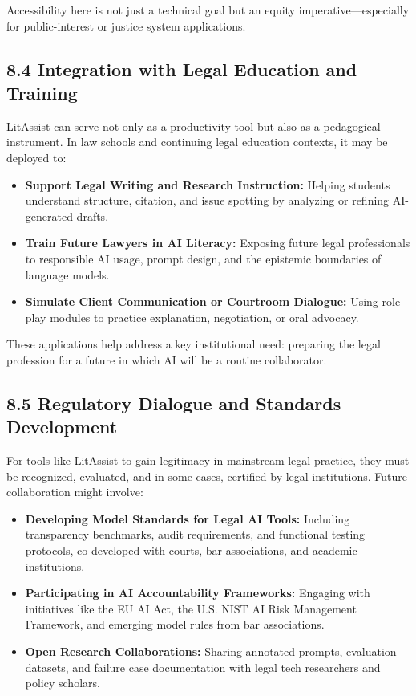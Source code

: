 \documentclass[12pt,a4paper]{article}
\begin{document}
Accessibility here is not just a technical goal but an equity imperative—especially for public-interest or justice system applications.

\subsection*{8.4 Integration with Legal Education and Training}

LitAssist can serve not only as a productivity tool but also as a pedagogical instrument. In law schools and continuing legal education contexts, it may be deployed to:

\begin{itemize}
\item \textbf{Support Legal Writing and Research Instruction:} Helping students understand structure, citation, and issue spotting by analyzing or refining AI-generated drafts.

\item \textbf{Train Future Lawyers in AI Literacy:} Exposing future legal professionals to responsible AI usage, prompt design, and the epistemic boundaries of language models.

\item \textbf{Simulate Client Communication or Courtroom Dialogue:} Using role-play modules to practice explanation, negotiation, or oral advocacy.
\end{itemize}

These applications help address a key institutional need: preparing the legal profession for a future in which AI will be a routine collaborator.

\subsection*{8.5 Regulatory Dialogue and Standards Development}

For tools like LitAssist to gain legitimacy in mainstream legal practice, they must be recognized, evaluated, and in some cases, certified by legal institutions. Future collaboration might involve:

\begin{itemize}
\item \textbf{Developing Model Standards for Legal AI Tools:} Including transparency benchmarks, audit requirements, and functional testing protocols, co-developed with courts, bar associations, and academic institutions.

\item \textbf{Participating in AI Accountability Frameworks:} Engaging with initiatives like the EU AI Act, the U.S. NIST AI Risk Management Framework, and emerging model rules from bar associations.

\item \textbf{Open Research Collaborations:} Sharing annotated prompts, evaluation datasets, and failure case documentation with legal tech researchers and policy scholars.
\end{itemize}
\end{document}
